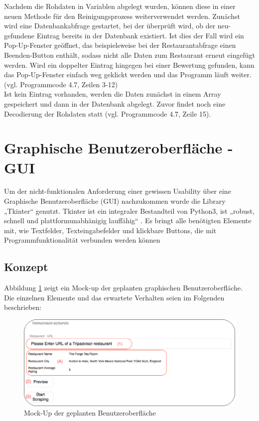 \documentclass[a4paper,oneside,12pt]{report}
\begin{document}
				Nachdem die Rohdaten in Variablen abgelegt wurden, können diese in einer neuen Methode für den Reinigungsprozess weiterverwendet werden. Zunächst wird eine Datenbankabfrage gestartet, bei der überprüft wird, ob der neu-gefundene Eintrag bereits in der Datenbank existiert. Ist dies der Fall wird ein Pop-Up-Fenster geöffnet, das beispielsweise bei der Restaurantabfrage einen Beenden-Button enthält, sodass nicht alle Daten zum Restaurant erneut eingefügt werden. Wird ein doppelter Eintrag hingegen bei einer Bewertung gefunden, kann das Pop-Up-Fenster einfach weg geklickt werden und das Programm läuft weiter. (vgl. Programmcode 4.7, Zeilen 3-12)
				\\
				Ist kein Eintrag vorhanden, werden die Daten zunächst in einem Array gespeichert und dann in der Datenbank abgelegt. Zuvor findet noch eine Decodierung der Rohdaten statt (vgl. Programmcode 4.7, Zeile 15).
		
		
	
	
		
		
				
				
		\section[Graphische Benutzeroberfläche - GUI - Skanny Morandi]{Graphische Benutzeroberfläche - GUI}\label{GUI}
		    Um der nicht-funktionalen Anforderung einer gewissen Usability über eine Graphische Benutzeroberfläche (GUI) nachzukommen wurde die Library „Tkinter“ genutzt. Tkinter ist ein integraler Bestandteil von Python3, ist „robust, schnell und plattformunabhänigig lauffähig“ \cite{bib-tkinterDocu}. Es bringt alle benötigten Elemente mit, wie Textfelder, Texteingabefelder und klickbare Buttons, die mit Programmfunktionalität verbunden werden können 

		
			\subsection[Konzept - Skanny Morandi]{Konzept}
			Abbildung \ref{pic-mock-up} zeigt ein Mock-up der geplanten graphischen Benutzeroberfläche. Die einzelnen Elemente und das erwartete Verhalten seien im Folgenden beschrieben: 
			
				\begin{figure}[h]
					\centering
					\begin{minipage}[b]{0.9\textwidth}
						\includegraphics[width=\textwidth]{Bilder/mock-up.png}
					\end{minipage}
					\centering
					\caption[Mock-Up der geplanten Benutzeroberfläche]{Mock-Up der geplanten Benutzeroberfläche}
					\label{pic-mock-up}
				\end{figure}
            
\end{document}
